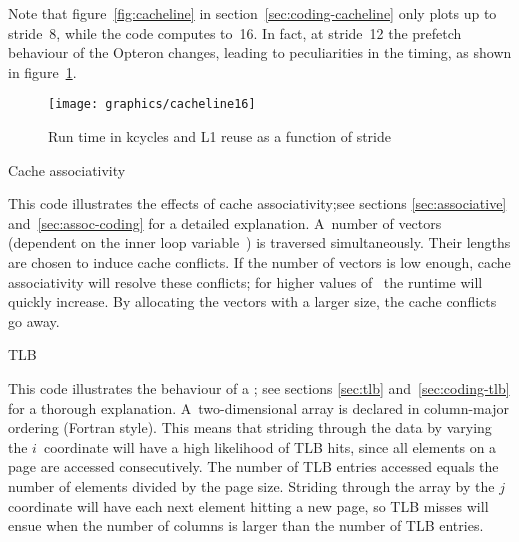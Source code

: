 Note that figure~\ref{fig:cacheline} in
section~\ref{sec:coding-cacheline} only plots up to stride~8, while
the code computes to~16. In fact, at stride~12 the prefetch behaviour
of the Opteron changes, leading to peculiarities in the timing, as
shown in figure~\ref{fig:cacheline16}.
\begin{figure}[ht]
  \texttt{[image: graphics/cacheline16]}
  \caption{Run time in kcycles and L1 reuse as a function of stride}
  \label{fig:cacheline16}
\end{figure}

 {Cache associativity}
\label{sec:assoc-code}

This code illustrates the effects of cache associativity;see sections
\ref{sec:associative} and~\ref{sec:assoc-coding} for a detailed
explanation. A~number of vectors (dependent on the inner loop
variable~) is traversed simultaneously.  Their lengths are
chosen to induce cache conflicts. If the number of vectors is low
enough, cache associativity will resolve these conflicts; for higher
values of~ the runtime will quickly increase. By allocating the
vectors with a larger size, the cache conflicts go away.

\begingroup\small

\endgroup

 {TLB}
\label{sec:tlb-code}

This code illustrates the behaviour of a ; see sections
\ref{sec:tlb} and~\ref{sec:coding-tlb} for a thorough
explanation. A~two-dimensional array is declared in column-major
ordering (Fortran style). This means that striding through the data by
varying the $i$~coordinate will have a high likelihood of TLB hits,
since all elements on a page are accessed consecutively. The number of
TLB entries accessed equals the number of elements divided by the page
size. Striding through the array by the $j$ coordinate will have each
next element hitting a new page, so TLB misses will ensue when the
number of columns is larger than the number of TLB entries.

\begingroup\small

\endgroup
